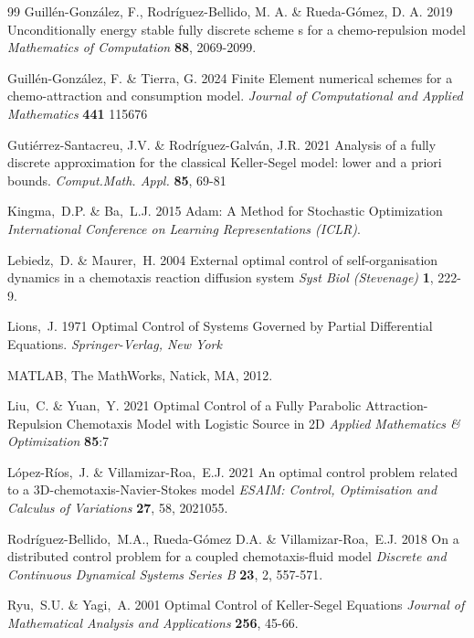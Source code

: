 \documentclass[11pt]{article}
\numberwithin{theorem}{section}
\begin{document}
\begin{thebibliography}{99}
Guill\'en-Gonz\'alez, F., Rodr\'iguez-Bellido, M. A. \& Rueda-G\'omez, D. A. 
2019
Unconditionally energy stable fully discrete scheme s for a chemo-repulsion model
\textit{Mathematics of Computation} \textbf{88}, 2069-2099.

Guill\'en-Gonz\'alez, F. \& Tierra, G.
2024
Finite Element numerical schemes for a chemo-attraction and consumption model. 
\textit{Journal of Computational and Applied Mathematics} \textbf{441} 115676

Guti\'errez-Santacreu, J.V. \& Rodr\'iguez-Galv\'an, J.R. 
2021
Analysis of a fully discrete approximation for the classical Keller-Segel model: lower and a priori bounds. 
\textit{Comput.Math. Appl.} \textbf{85}, 69-81

  Kingma,~D.P. \& Ba,~L.J. 
2015   
Adam: A Method for Stochastic Optimization
\textit{International Conference on Learning Representations (ICLR)}. 



  Lebiedz,~D. \& Maurer,~H. 
2004   
External optimal control of self-organisation dynamics in a chemotaxis reaction diffusion system
\textit{Syst Biol (Stevenage)} \textbf{1}, 222-9. 


 Lions,~J. 
1971
Optimal Control of Systems Governed by Partial Differential Equations. \textit{Springer-Verlag, New York}

 MATLAB, The MathWorks, Natick, MA, 2012.

 Liu,~C. \& Yuan,~Y.
2021
Optimal Control of a Fully Parabolic Attraction-Repulsion Chemotaxis Model with Logistic Source in 2D
\textit{Applied Mathematics \& Optimization } \textbf{85}:7




  L\'opez-R\'ios,~J. \& Villamizar-Roa,~E.J. 
2021
An optimal control problem related to a 3D-chemotaxis-Navier-Stokes model
\textit{ESAIM: Control, Optimisation and Calculus of Variations} \textbf{27}, 58, 2021055. 

  Rodr\'iguez-Bellido,~M.A., Rueda-G\'omez D.A. \& Villamizar-Roa,~E.J. 
2018
On a distributed control problem for a coupled chemotaxis-fluid model
\textit{Discrete and Continuous Dynamical Systems Series B} \textbf{23}, 2, 557-571. 


  Ryu,~S.U. \& Yagi,~A. 
2001   
Optimal Control of Keller-Segel Equations
\textit{Journal of Mathematical Analysis and Applications} \textbf{256}, 45-66. 



\end{thebibliography}
\end{document}
